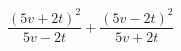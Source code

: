 \begin{ex}[type=expression]
	\begin{condition}
		\( \dfrac{(5v+2t)^2}{5v-2t}+\dfrac{(5v-2t)^2}{5v+2t} \)
	\end{condition}
\end{ex}